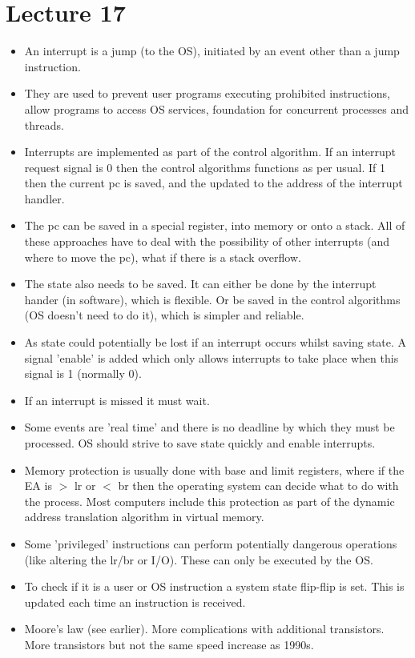 \documentclass{article}
\begin{document}
\section*{Lecture 17}
\begin{itemize}
\item An interrupt is a jump (to the OS), initiated by an event other than a jump instruction.
\item They are used to prevent user programs executing prohibited instructions, allow programs to access OS services, foundation for concurrent processes and threads.
\item Interrupts are implemented as part of the control algorithm. If an interrupt request signal is 0 then the control algorithms functions as per usual. If 1 then the current pc is saved, and the updated to the address of the interrupt handler.
\item The pc can be saved in a special register, into memory or onto a stack. All of these approaches have to deal with the possibility of other interrupts (and where to move the pc), what if there is a stack overflow.
\item The state also needs to be saved. It can either be done by the interrupt hander (in software), which is flexible. Or be saved in the control algorithms (OS doesn't need to do it), which is simpler and reliable.
\item As state could potentially be lost if an interrupt occurs whilst saving state. A signal 'enable' is added which only allows interrupts to take place when this signal is 1 (normally 0).
\item If an interrupt is missed it must wait.
\item Some events are 'real time' and there is no deadline by which they must be processed. OS should strive to save state quickly and enable interrupts.
\item Memory protection is usually done with base and limit registers, where if the EA is $>$ lr or $<$ br then the operating system can decide what to do with the process. Most computers include this protection as part of the dynamic address translation algorithm in virtual memory.
\item Some 'privileged'  instructions can perform potentially dangerous operations (like altering the lr/br or I/O). These can only be executed by the OS.
\item To check if it is a user or OS instruction a system state flip-flip is set. This is updated each time an instruction is received. 
\item Moore's law (see earlier). More complications with additional transistors. More transistors but not the same speed increase as 1990s.

\end{itemize}
\end{document}
